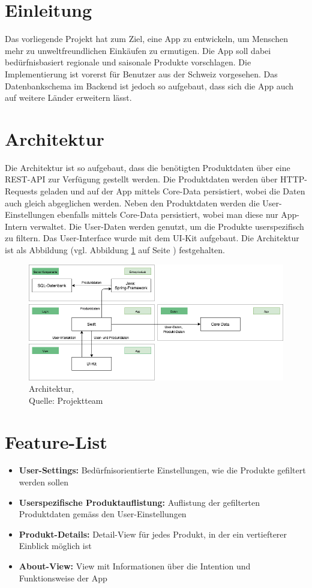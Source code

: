 \documentclass[12pt,titlepage]{article}
\begin{document}
\section{Einleitung}
Das vorliegende Projekt hat zum Ziel, eine App zu entwickeln, um Menschen mehr zu unweltfreundlichen Einkäufen zu ermutigen. Die App soll dabei bedürfnisbasiert regionale und saisonale Produkte vorschlagen. Die Implementierung ist vorerst für Benutzer aus der Schweiz vorgesehen. Das Datenbankschema im Backend ist jedoch so aufgebaut, dass sich die App auch auf weitere Länder erweitern lässt.

\section{Architektur}
Die Architektur ist so aufgebaut, dass die benötigten Produktdaten über eine REST-API zur Verfügung gestellt werden. Die Produktdaten werden über HTTP-Requests geladen und auf der App mittels Core-Data persistiert, wobei die Daten auch gleich abgeglichen werden. Neben den Produktdaten werden die User-Einstellungen ebenfalls mittels Core-Data persistiert, wobei man diese nur App-Intern verwaltet. Die User-Daten werden genutzt, um die Produkte userspezifisch zu filtern. Das User-Interface wurde mit dem UI-Kit aufgebaut. Die Architektur ist als Abbildung (vgl. Abbildung \ref{img: Architektur} auf Seite \pageref{img: Architektur}) festgehalten.
\begin{figure}[H]
	\centering
	\includegraphics[width=15cm]{Img/Architektur2.png}
	\caption[Architektur]{Architektur,\\ Quelle: Projektteam}
	\label{img: Architektur}
\end{figure}

\section{Feature-List}
\begin{itemize}
	\item \textbf{User-Settings:} Bedürfnisorientierte Einstellungen, wie die Produkte gefiltert werden sollen
	\item \textbf{Userspezifische Produktauflistung:} Auflistung der gefilterten Produktdaten gemäss den User-Einstellungen
	\item \textbf{Produkt-Details:} Detail-View für jedes Produkt, in der ein vertiefterer Einblick möglich ist
	\item \textbf{About-View:} View mit Informationen über die Intention und Funktionsweise der App
\end{itemize}
\end{document}
